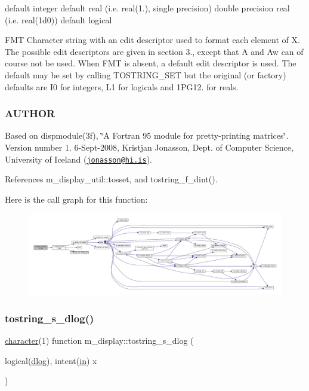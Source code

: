 default integer default real (i.\+e. real(1.), single precision) double precision real (i.\+e. real(1d0)) default logical

F\+MT Character string with an edit descriptor used to format each element of X. The possible edit descriptors are given in section 3., except that A and Aw can of course not be used. When F\+MT is absent, a default edit descriptor is used. The default may be set by calling T\+O\+S\+T\+R\+I\+N\+G\+\_\+\+S\+ET but the original (or factory) defaults are I0 for integers, L1 for logicals and 1\+P\+G12. for reals.

\subsubsection*{A\+U\+T\+H\+OR}

Based on dispmodule(3f), \char`\"{}\+A Fortran 95 module for pretty-\/printing matrices\char`\"{}. Version number 1. 6-\/\+Sept-\/2008, Kristjan Jonasson, Dept. of Computer Science, University of Iceland (\href{mailto:jonasson@hi.is}{\tt jonasson@hi.\+is}). 

References m\+\_\+display\+\_\+util\+::tosset, and tostring\+\_\+f\+\_\+dint().

Here is the call graph for this function\+:
\nopagebreak
\begin{figure}[H]
\begin{center}
\leavevmode
\includegraphics[width=350pt]{namespacem__display_a5bfeb905fb5036068ef0012eb2f563fa_cgraph}
\end{center}
\end{figure}
\mbox{\label{namespacem__display_a75e826c601efdb91148684ebaf34788b}} 
\subsubsection{\texorpdfstring{tostring\+\_\+s\+\_\+dlog()}{tostring\_s\_dlog()}}
{\footnotesize\ttfamily \hyperlink{option__stopwatch_83_8txt_abd4b21fbbd175834027b5224bfe97e66}{character}(1) function m\+\_\+display\+::tostring\+\_\+s\+\_\+dlog (\begin{DoxyParamCaption}\item[{logical(\hyperlink{namespacem__display_a8c6a3df510feabf6bc84dd0a8789f98c}{dlog}), intent(\hyperlink{M__journal_83_8txt_afce72651d1eed785a2132bee863b2f38}{in})}]{x }\end{DoxyParamCaption})\hspace{0.3cm}{\ttfamily [private]}}



